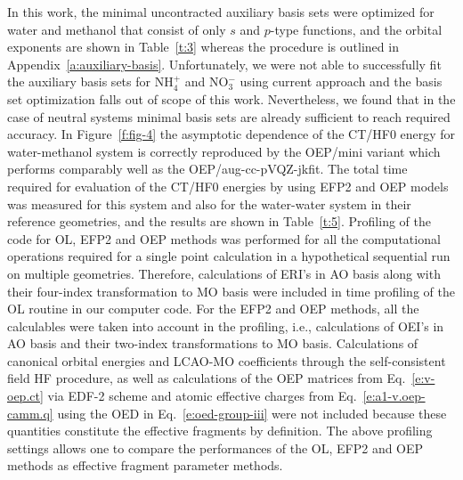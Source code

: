 \documentclass[aip,jcp,amsmath,amssymb,reprint,floatfix]{revtex4-1}
\begin{document}
In this work, the minimal uncontracted auxiliary basis sets were optimized for water and methanol
that consist of only $s$ and $p$\hyp{}type functions,
and the orbital exponents are shown in Table~\ref{t:3}
whereas the procedure is outlined in Appendix~\ref{a:auxiliary-basis}.
Unfortunately, we were not able to successfully fit the auxiliary basis sets
for NH$_4^+$ and NO$_3^-$ using current approach
and the basis set optimization falls out of scope of this work.
Nevertheless, we found that in the case of neutral systems minimal basis
sets are already sufficient to reach required accuracy.
In Figure~\ref{f:fig-4} the asymptotic dependence of the CT/HF0 energy
for water\hyp{}methanol system is correctly reproduced by the OEP/mini variant
which
performs comparably well as the OEP/aug-cc-pVQZ-jkfit. 
The total time required for evaluation of the CT/HF0 energies by using EFP2 and OEP
models was measured for this system and also for the water\hyp{}water system in their reference geometries,
and the results are shown in Table~\ref{t:5}. 
Profiling of the code for OL, EFP2 and OEP methods was performed 
for all the computational operations required for a
single point calculation in a hypothetical sequential run on multiple
geometries. Therefore, calculations of ERI's in AO basis 
along with their four\hyp{}index transformation to MO basis were included in
time profiling of the OL routine in our computer code. For the EFP2 
and OEP methods, all the calculables were taken into account in the profiling,
i.e., calculations of OEI's in AO basis and their two\hyp{}index transformations
to MO basis. Calculations of canonical orbital 
energies and LCAO\hyp{}MO coefficients through the self\hyp{}consistent field
HF procedure, as well as calculations of the
OEP matrices from Eq.~\eqref{e:v-oep.ct} 
via EDF-2 scheme and atomic effective charges from Eq.~\eqref{e:a1-v.oep-camm.q}
using the OED in Eq.~\eqref{e:oed-group-iii}
were not included because these quantities constitute the effective fragments
by definition.
The above profiling settings allows one to compare the performances
of the OL, EFP2 and OEP methods as effective fragment parameter methods.
\end{document}

